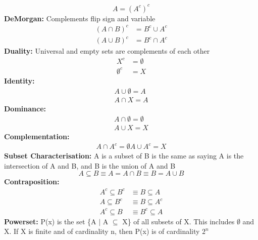 \documentclass[a4paper,10pt]{article}
\begin{document}
\begin{equation*}
A = (A^{c})^{c}
\end{equation*}
\newline
\textcolor{BlueGreen}{\textbf{DeMorgan:}} Complements flip sign and variable \\
\begin{align*}
(A \cap B)^{c} &= B^{c} \cup A^{c} \\
(A \cup B)^{c} &= B^{c} \cap A^{c} 
\end{align*}
\textcolor{BlueGreen}{\textbf{Duality:}} Universal and empty sets are complements of each other \\
\begin{align*}
X^{c} &= \emptyset \\
\emptyset^{c} &= X
\end{align*}
\textcolor{BlueGreen}{\textbf{Identity:}} \\
\begin{align*}
A \cup \emptyset = A \\
A \cap X = A
\end{align*}
\textcolor{BlueGreen}{\textbf{Dominance:}} \\
\begin{align*}
A \cap \emptyset = \emptyset \\ 
A \cup X = X
\end{align*}
\textcolor{BlueGreen}{\textbf{Complementation:}} \\
\begin{align*}
A \cap A^{c} = \emptyset 
A \cup A^{c} = X
\end{align*}
\textcolor{BlueGreen}{\textbf{Subset Characterisation:}} A is a subset of B is the same as saying A is the intersection of A and B, and B is the union of A and B \\
\begin{equation*}
A \subseteq B \equiv A = A \cap B \equiv B = A \cup B
\end{equation*} 
\textcolor{BlueGreen}{\textbf{Contraposition:}} \\
\begin{align*}
A^{c} \subseteq B^{c} &\equiv B \subseteq A \\
A \subseteq B^{c} &\equiv B \subseteq A^{c} \\
A^{c} \subseteq B &\equiv B^{c} \subseteq A
\end{align*}
\newline
\textcolor{BlueGreen}{\textbf{Powerset:}} P(x) is the set \{A $|$ A $\subseteq$ X\} of all subsets of X. This includes $\emptyset$ and X. If X is finite and of cardinality n, then P(x) is of cardinality $2^{n}$ \\\\
\end{document}
